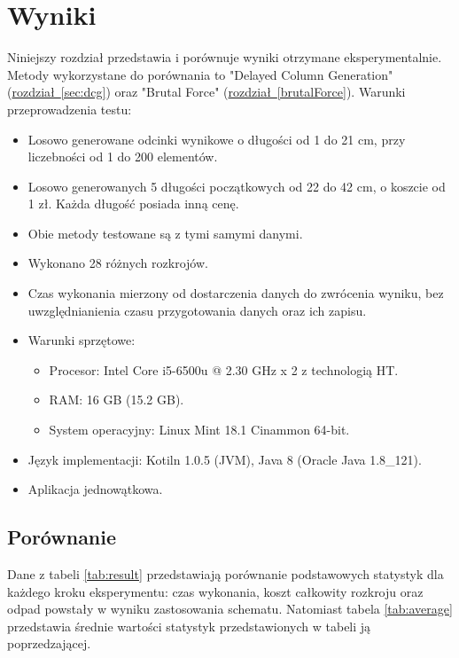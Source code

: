 \section{Wyniki}

Niniejszy rozdział przedstawia i porównuje wyniki otrzymane eksperymentalnie. Metody wykorzystane do porównania to "Delayed Column Generation" (\hyperref[sec:dcg]{rozdział~\ref*{sec:dcg}}) oraz "Brutal Force" (\hyperref[brutalForce]{rozdział~\ref*{brutalForce}}). Warunki przeprowadzenia testu:
\begin{itemize}
  \item Losowo generowane odcinki wynikowe o długości od 1 do 21 cm, przy liczebności od 1 do 200 elementów.
  \item Losowo generowanych 5 długości początkowych od 22 do 42 cm, o koszcie od 1 zł. Każda długość posiada inną cenę.
  \item Obie metody testowane są z tymi samymi danymi.
  \item Wykonano 28 różnych rozkrojów.
  \item Czas wykonania mierzony od dostarczenia danych do zwrócenia wyniku, bez uwzględnianienia czasu przygotowania danych oraz ich zapisu.
  \item Warunki sprzętowe:
  \begin{itemize}
    \item Procesor: Intel Core i5-6500u @ 2.30 GHz x 2 z technologią HT.
    \item RAM: 16 GB (15.2 GB).
    \item System operacyjny: Linux Mint 18.1 Cinammon 64-bit.
  \end{itemize}
  \item Język implementacji: Kotiln 1.0.5 (JVM), Java 8 (Oracle Java 1.8\_121).
  \item Aplikacja jednowątkowa.
\end{itemize}
\subsection{Porównanie}

Dane z tabeli \ref{tab:result} przedstawiają porównanie podstawowych statystyk dla każdego kroku eksperymentu: czas wykonania, koszt całkowity rozkroju oraz odpad powstały w wyniku zastosowania schematu. Natomiast tabela \ref{tab:average} przedstawia średnie wartości statystyk przedstawionych w tabeli ją poprzedzającej.

